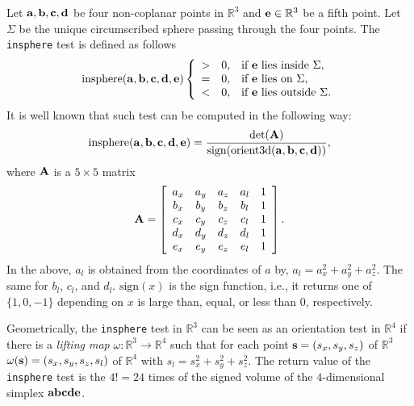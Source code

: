 Let ${\bf a}, {\bf b}, {\bf c}, {\bf d}$ be four non-coplanar points in $\mathbb{R}^3$ and ${\bf e} \in \mathbb{R}^3$ be a fifth point.%
Let $\Sigma$ be the unique circumscribed sphere passing through the four points. The {\tt insphere} test is defined as follows
\begin{equation}
  \textrm{insphere}({\bf a}, {\bf b}, {\bf c}, {\bf d}, {\bf e})
  \left\{
  \begin{array}{ccl}
  > & 0, & \textrm{if ${\bf e}$ lies inside $\Sigma$},\\
  = & 0, & \textrm{if ${\bf e}$ lies on $\Sigma$},\\
  < & 0, & \textrm{if ${\bf e}$ lies outside $\Sigma$}.  
  \end{array}
  \right.
\end{equation}
It is well known that such test can be computed in the following way:
\begin{equation}\label{equ:insph}
 \textrm{insphere}({\bf a}, {\bf b}, {\bf c}, {\bf d}, {\bf e}) = \frac{\textrm{det}({\bf A})}{\textrm{sign}(\textrm{orient3d}({\bf a}, {\bf b}, {\bf c}, {\bf d}))},
\end{equation}
where ${\bf A}$ is a $5 \times 5$ matrix
\begin{equation}
  {\bf A} = \left[\begin{array}{ccccc}
      a_x & a_y & a_z & a_l & 1\\
      b_x & b_y & b_z & b_l & 1\\
      c_x & c_y & c_z & c_l & 1\\
      d_x & d_y & d_z & d_l & 1\\
      e_x & e_y & e_z & e_l & 1 
      \end{array}\right].
\end{equation}
In the above, $a_l$ is obtained from the coordinates of $a$ by,
$a_l = a_x^2 + a_y^2 + a_z^2$.  The same for $b_l$, $c_l$, and $d_l$. $\textrm{sign}(x)$ is the sign function, i.e., it returns one of $\{1, 0, -1\}$ depending on $x$ is large than, equal, or less than $0$, respectively.

Geometrically, the {\tt insphere} test in $\mathbb{R}^3$ can be seen as an orientation test in $\mathbb{R}^4$ if there is a {\it lifting map} $\omega: \mathbb{R}^3 \to \mathbb{R}^4$ such that for each point ${\bf s} = (s_x, s_y, s_z)$ of $\mathbb{R}^3$ $\omega({\bf s}) = (s_x, s_y, s_z, s_l)$ of $\mathbb{R}^4$ with $s_l = s_x^2 + s_y^2 + s_z^2$.  The return value of the {\tt insphere} test is the $4! = 24$ times of the signed volume of the $4$-dimensional simplex ${\bf abcde}$. 

